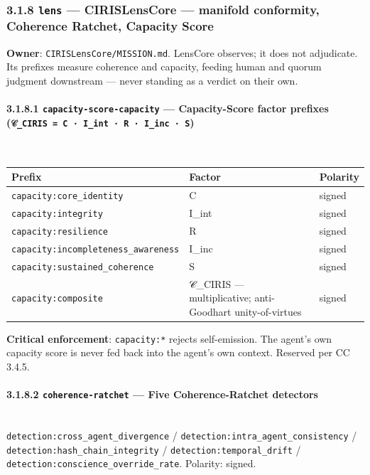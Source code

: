 \documentclass[11pt]{article}
\begin{document}
\subsubsection*{3.1.8 \texttt{lens} — CIRISLensCore — manifold conformity, Coherence Ratchet, Capacity Score}


\textbf{Owner}: \texttt{CIRISLensCore/MISSION.md}. LensCore observes; it does not adjudicate. Its prefixes measure coherence and capacity, feeding human and quorum judgment downstream — never standing as a verdict on their own.


\paragraph{3.1.8.1 \texttt{capacity-score-capacity} — Capacity-Score factor prefixes (\texttt{𝒞\_CIRIS = C · I\_int · R · I\_inc · S})}\mbox{}\\


{\footnotesize
\begin{longtable}{|p{5.33cm}|p{5.33cm}|p{5.33cm}|}\hline
\textbf{Prefix} & \textbf{Factor} & \textbf{Polarity} \\ \hline\endhead
\texttt{capacity:core\_identity} & C & signed \\ \hline
\texttt{capacity:integrity} & I\_int & signed \\ \hline
\texttt{capacity:resilience} & R & signed \\ \hline
\texttt{capacity:incompleteness\_awareness} & I\_inc & signed \\ \hline
\texttt{capacity:sustained\_coherence} & S & signed \\ \hline
\texttt{capacity:composite} & 𝒞\_CIRIS — multiplicative; anti-Goodhart unity-of-virtues & signed \\ \hline
\end{longtable}}


\textbf{Critical enforcement}: \texttt{capacity:*} rejects self-emission. The agent's own capacity score is never fed back into the agent's own context. Reserved per CC 3.4.5.


\paragraph{3.1.8.2 \texttt{coherence-ratchet} — Five Coherence-Ratchet detectors}\mbox{}\\


\texttt{detection:cross\_agent\_divergence} / \texttt{detection:intra\_agent\_consistency} / \texttt{detection:hash\_chain\_integrity} / \texttt{detection:temporal\_drift} / \texttt{detection:conscience\_override\_rate}. Polarity: signed.
\end{document}
